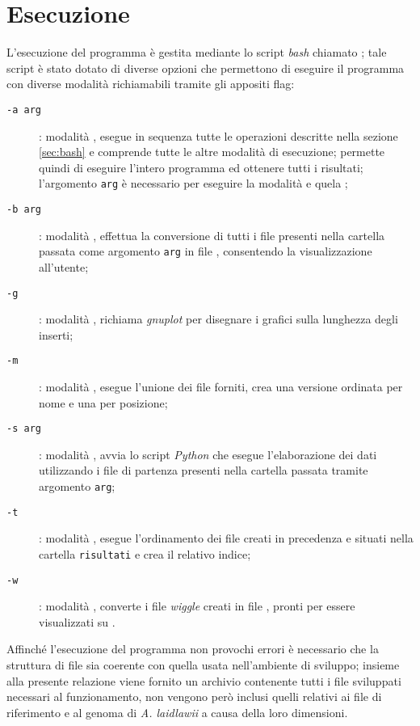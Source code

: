\section{Esecuzione}
L'esecuzione del programma è gestita mediante lo script \emph{bash} chiamato ; tale script è stato dotato di diverse opzioni che permettono di eseguire il programma con diverse modalità richiamabili tramite gli appositi flag:

\begin{description}
\item[\texttt{-a arg}]: modalità , esegue in sequenza tutte le operazioni descritte nella sezione \ref{sec:bash} e comprende tutte le altre modalità di esecuzione; permette quindi di eseguire l'intero programma ed ottenere tutti i risultati; l'argomento \texttt{arg} è necessario per eseguire la modalità  e quela ;
\item[\texttt{-b arg}]: modalità , effettua la conversione di tutti i file  presenti nella cartella passata come argomento \texttt{arg} in file , consentendo la visualizzazione all'utente;
\item[\texttt{-g}]: modalità , richiama \emph{gnuplot} per disegnare i grafici sulla lunghezza degli inserti;
\item[\texttt{-m}]: modalità , esegue l'unione dei file  forniti, crea una versione ordinata per nome e una per posizione;
\item[\texttt{-s arg}]: modalità , avvia lo script \emph{Python} che esegue l'elaborazione dei dati utilizzando i file  di partenza presenti nella cartella passata tramite argomento \texttt{arg};
\item[\texttt{-t}]: modalità , esegue l'ordinamento dei file  creati in precedenza e situati nella cartella \texttt{risultati} e crea il relativo indice;
\item[\texttt{-w}]: modalità , converte i file \emph{wiggle} creati in file , pronti per essere visualizzati su .
\end{description}

Affinché l'esecuzione del programma non provochi errori è necessario che la struttura di file sia coerente con quella usata nell'ambiente di sviluppo; insieme alla presente relazione viene fornito un archivio contenente tutti i file sviluppati necessari al funzionamento, non vengono però inclusi quelli relativi ai file  di riferimento e al genoma di \emph{A. laidlawii} a causa della loro dimensioni.

